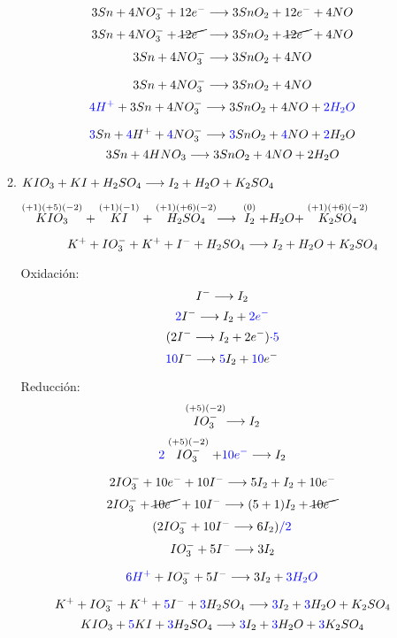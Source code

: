 \documentclass[../practica.root.tex]{subfiles}
\begin{document}
\begin{enumerate}
\begin{enumerate}
		            \[ 3 Sn + 4 NO_3^- + 12 e^- \longrightarrow{} 3 SnO_2 + 12 e^- + 4 NO \]
		            \[ 3 Sn + 4 NO_3^- + \cancel{12 e^-} \longrightarrow{} 3 SnO_2 + \cancel{12 e^-} + 4 NO \]
		            \[ 3 Sn + 4 NO_3^- \longrightarrow{} 3 SnO_2 + 4 NO \]

		            \[ 3 Sn + 4 NO_3^- \longrightarrow{} 3 SnO_2 + 4 NO \]
		            \[ \textcolor{blue}{4H^+} + 3 Sn + 4 NO_3^- \longrightarrow{} 3 SnO_2 + 4 NO + \textcolor{blue}{2H_2O} \]

		            \[ \textcolor{blue}{3} Sn + \textcolor{blue}{4} H^+ + \textcolor{blue}{4} NO_3^- \longrightarrow{} \textcolor{blue}{3} SnO_2 + \textcolor{blue}{4} NO + \textcolor{blue}{2} H_2O \]
		            \[ 3 Sn + 4 HNO_3 \longrightarrow{} 3 SnO_2 + 4 NO + 2 H_2O \]

		      \item $KIO_3 + KI + H_2SO_4 \longrightarrow{} I_2 + H_2O + K_2SO_4$

		            $\stackrel{(+1)(+5)(-2)}{KIO_3} + \stackrel{(+1)(-1)}{KI} + \stackrel{(+1)(+6)(-2)}{H_2SO_4}
			            \longrightarrow{} \stackrel{(0)}{I_2} + H_2O + \stackrel{(+1)(+6)(-2)}{K_2SO_4}$

		            \[ K^+ + IO_3^- + K^+ + I^- + H_2SO_4 \longrightarrow{} I_2 + H_2O + K_2SO_4 \]
		            \begin{multicols}{2}
			            Oxidación:
			            \[ I^- \longrightarrow{} I_2 \]
			            \[ \textcolor{blue}{2} I^- \longrightarrow{} I_2 + \textcolor{blue}{2e^-} \]
			            \[ (2 I^- \longrightarrow{} I_2 + 2e^-)\textcolor{blue}{\cdot 5} \]
			            \[ \textcolor{blue}{10} I^- \longrightarrow{} \textcolor{blue}{5} I_2 + \textcolor{blue}{10} e^- \]

			            \columnbreak

			            Reducción:
			            \[ \stackrel{(+5)(-2)}{IO_3^-} \longrightarrow{} I_2 \]
			            \[ \textcolor{blue}{2} \stackrel{(+5)(-2)}{IO_3^-} + \textcolor{blue}{10e^-} \longrightarrow{} I_2 \]
		            \end{multicols}

		            \[ 2 IO_3^- + 10 e^- + 10 I^- \longrightarrow{} 5 I_2 + I_2 + 10 e^- \]
		            \[ 2 IO_3^- + \cancel{10 e^-} + 10 I^- \longrightarrow{} (5 + 1) I_2 + \cancel{10 e^-} \]
		            \[ (2 IO_3^- + 10 I^- \longrightarrow{} 6 I_2)\textcolor{blue}{/2} \]
		            \[ IO_3^- + 5 I^- \longrightarrow{} 3 I_2 \]

		            \[ \textcolor{blue}{6H^+} + IO_3^- + 5 I^- \longrightarrow{} 3 I_2 + \textcolor{blue}{3H_2O} \]

		            \[ K^+ + IO_3^- + K^+ + \textcolor{blue}{5} I^- + \textcolor{blue}{3} H_2SO_4 \longrightarrow{} \textcolor{blue}{3} I_2 + \textcolor{blue}{3} H_2O + K_2SO_4 \]
		            \[ KIO_3 + \textcolor{blue}{5} KI + \textcolor{blue}{3} H_2SO_4 \longrightarrow{} \textcolor{blue}{3} I_2 + \textcolor{blue}{3} H_2O + \textcolor{blue}{3} K_2SO_4 \]


\end{enumerate}
\end{enumerate}
\end{document}
